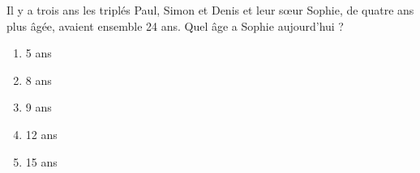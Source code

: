 Il y a trois ans les triplés Paul, Simon et Denis et leur s\oe ur Sophie, de quatre ans plus âgée, avaient ensemble 24 ans. Quel âge a Sophie aujourd'hui ?
\begin{multicols}{5}
  \begin{enumerate}[A/]
  \item 5 ans
  \item 8 ans
  \item 9 ans
  \item 12 ans
  \item 15 ans
  \end{enumerate}
  \end{multicols}
